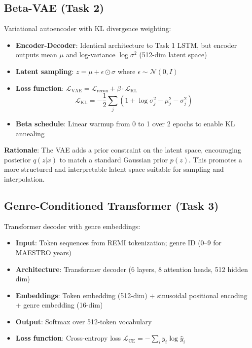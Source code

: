 \documentclass[conference]{IEEEtran}
\begin{document}
\subsection{Beta-VAE (Task 2)}
Variational autoencoder with KL divergence weighting:
\begin{itemize}
    \item \textbf{Encoder-Decoder}: Identical architecture to Task 1 LSTM, but encoder outputs mean $\mu$ and log-variance $\log \sigma^2$ (512-dim latent space)
    \item \textbf{Latent sampling}: $z = \mu + \epsilon \odot \sigma$ where $\epsilon \sim \mathcal{N}(0, I)$
    \item \textbf{Loss function}: $\mathcal{L}_{\text{VAE}} = \mathcal{L}_{\text{recon}} + \beta \cdot \mathcal{L}_{\text{KL}}$
    \begin{equation}
    \mathcal{L}_{\text{KL}} = -\frac{1}{2} \sum_j (1 + \log \sigma_j^2 - \mu_j^2 - \sigma_j^2)
    \end{equation}
    \item \textbf{Beta schedule}: Linear warmup from 0 to 1 over 2 epochs to enable KL annealing
\end{itemize}

\textbf{Rationale}: The VAE adds a prior constraint on the latent space, encouraging posterior $q(z|x)$ to match a standard Gaussian prior $p(z)$. This promotes a more structured and interpretable latent space suitable for sampling and interpolation.

\subsection{Genre-Conditioned Transformer (Task 3)}
Transformer decoder with genre embeddings:
\begin{itemize}
    \item \textbf{Input}: Token sequences from REMI tokenization; genre ID (0--9 for MAESTRO years)
    \item \textbf{Architecture}: Transformer decoder (6 layers, 8 attention heads, 512 hidden dim)
    \item \textbf{Embeddings}: Token embedding (512-dim) + sinusoidal positional encoding + genre embedding (16-dim)
    \item \textbf{Output}: Softmax over 512-token vocabulary
    \item \textbf{Loss function}: Cross-entropy loss $\mathcal{L}_{\text{CE}} = -\sum_i y_i \log \hat{y}_i$
\end{itemize}
\end{document}
